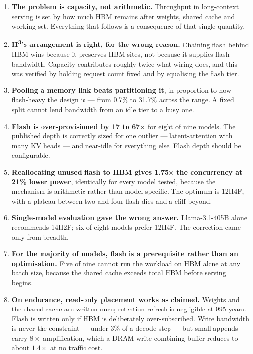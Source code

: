 \documentclass[11pt,a4paper]{article}
\begin{document}
\begin{enumerate}[itemsep=5pt]

\item \textbf{The problem is capacity, not arithmetic.} Throughput in
long-context serving is set by how much HBM remains after weights, shared cache
and working set. Everything that follows is a consequence of that single
quantity.

\item \textbf{H\textsuperscript{3}'s arrangement is right, for the wrong
reason.} Chaining flash behind HBM wins because it preserves HBM sites, not
because it supplies flash bandwidth. Capacity contributes roughly twice what
wiring does, and this was verified by holding request count fixed and by
equalising the flash tier.

\item \textbf{Pooling a memory link beats partitioning it}, in proportion to how
flash-heavy the design is --- from 0.7\% to 31.7\% across the range. A fixed
split cannot lend bandwidth from an idle tier to a busy one.

\item \textbf{Flash is over-provisioned by 17 to 67$\times$} for eight of nine
models. The published depth is correctly sized for one outlier ---
latent-attention with many KV heads --- and near-idle for everything else. Flash
depth should be configurable.

\item \textbf{Reallocating unused flash to HBM gives 1.75$\times$ the
concurrency at 21\% lower power}, identically for every model tested, because
the mechanism is arithmetic rather than model-specific. The optimum is 12H4F,
with a plateau between two and four flash dies and a cliff beyond.

\item \textbf{Single-model evaluation gave the wrong answer.} Llama-3.1-405B
alone recommends 14H2F; six of eight models prefer 12H4F. The correction came
only from breadth.

\item \textbf{For the majority of models, flash is a prerequisite rather than an
optimisation.} Five of nine cannot run the workload on HBM alone at any batch
size, because the shared cache exceeds total HBM before serving begins.

\item \textbf{On endurance, read-only placement works as claimed.} Weights and
the shared cache are written once; retention refresh is negligible at 995 years.
Flash is written only if HBM is deliberately over-subscribed. Write bandwidth is
never the constraint --- under 3\% of a decode step --- but small appends carry
$8\times$ amplification, which a DRAM write-combining buffer reduces to about
$1.4\times$ at no traffic cost.


\end{enumerate}
\end{document}
